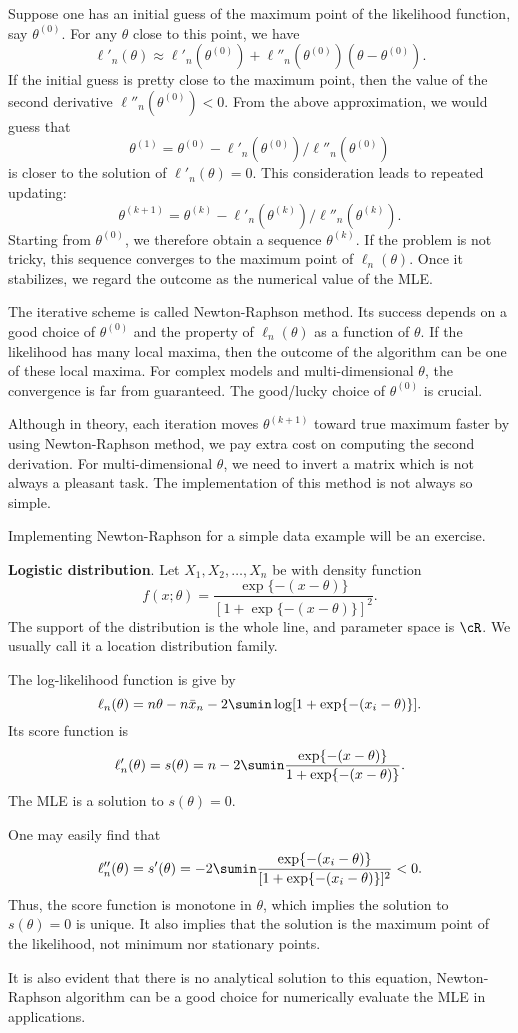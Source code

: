 Suppose one has an initial guess of the maximum point of the likelihood
function, say $\theta^{(0)}$. For any $\theta$ close to this point, we have
\[
\ell'_n (\theta) \approx \ell'_n(\theta^{(0)}) + \ell''_n(\theta^{(0)}) (\theta - \theta^{(0)}).
\]
If the initial guess is pretty close to the maximum point, then the value of the
second derivative  $\ell''_n(\theta^{(0)}) < 0$. 
From the above approximation, we would guess that
\[
\theta^{(1)} = \theta^{(0)}  -  \ell'_n(\theta^{(0)})/ \ell''_n(\theta^{(0)})
\]
is closer to the solution of $\ell'_n(\theta) = 0$.
This consideration leads to repeated updating:
\[
\theta^{(k+1)} = \theta^{(k)}  -  \ell'_n(\theta^{(k)})/ \ell''_n(\theta^{(k)}).
\]
Starting from $\theta^{(0)}$, we therefore obtain a sequence $\theta^{(k)}$.
If the problem is not tricky, this sequence converges to the maximum point
of $\ell_n(\theta)$. Once it stabilizes, we regard the outcome as the
numerical value of the MLE.

The iterative scheme is called Newton-Raphson method. Its success
depends on a good choice of $\theta^{(0)}$ and the property of $\ell_n(\theta)$
as a function of $\theta$. If the likelihood has many local maxima, then
the outcome of the algorithm can be one of these local maxima. 
For complex models and multi-dimensional $\theta$,
the convergence is far from guaranteed. The good/lucky choice of 
 $\theta^{(0)}$ is crucial.
 
Although in theory, each iteration moves $\theta^{(k+1)}$ toward
true maximum faster by using Newton-Raphson method,
we pay extra cost on computing the second derivation.
For multi-dimensional $\theta$, we need to invert a matrix which
is not always a pleasant task.
The implementation of this method is not always so simple.
 
Implementing Newton-Raphson for a simple data example will
be an exercise.

\begin{example}
{\bf Logistic distribution}. Let $X_1, X_2, \ldots, X_n$
be \iid with density function
\[
f(x; \theta) 
=
\frac{ \exp \{ - (x - \theta)\}}{[1 + \exp \{ - (x-\theta) \}]^2}.
\]
The support of the distribution is the whole line, and
parameter space is $\cR$. We usually call it
a location distribution family.

The log-likelihood function is give by
\[
\ell_n(\theta) = n\theta - n \bar x_n
-
2 \sumin \log [ 1 + \exp\{ - (x_i - \theta)\}].
\]
Its score function is
\[
\ell'_n(\theta) = s(\theta) 
= n - 2 \sumin \frac{ \exp \{ - (x - \theta)\}}{1 + \exp \{ - (x-\theta) \}}.
\]
The MLE is a solution to $s(\theta) = 0$.

One may easily find that
\[
\ell''_n(\theta) =
s'(\theta) =
- 2 \sumin
\frac{ \exp \{ - (x_i - \theta)\}}{[1 + \exp \{ - (x_i -\theta) \}]^2}
< 0.
\]
Thus, the score function is monotone in $\theta$,
which implies the solution to $s(\theta) = 0$ is unique.
It also implies that the solution is the maximum point of
the likelihood, not minimum nor stationary points.

It is also evident that there is no analytical solution to
this equation, Newton-Raphson algorithm can be a good
choice for numerically evaluate the MLE in applications. 
\end{example}

